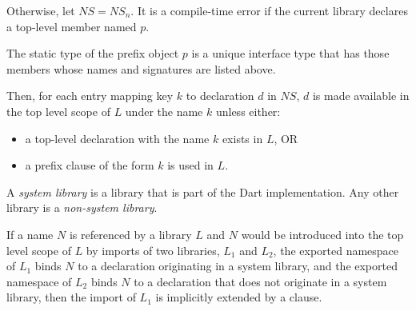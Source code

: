 \documentclass{article}
\begin{document}
\LMHash{}
Otherwise, let $NS = NS_n$.
It is a compile-time error if the current library declares a top-level member named $p$.

The static type of the prefix object $p$ is a unique interface type that has those members whose names and signatures are listed above.


\LMHash{}
Then, for each entry mapping key $k$ to declaration $d$ in $NS$, $d$ is made available in the top level scope of $L$ under the name $k$ unless either:
\begin{itemize}
\item
a top-level declaration with the name $k$ exists in $L$, OR
\item a prefix clause of the form \AS{} $k$ is used in $L$.
\end{itemize}


\LMHash{}
A {\em system library} is a library that is part of the Dart implementation.
Any other library is a {\em non-system library}.

If a name $N$ is referenced by a library $L$
and $N$ would be introduced into the top level scope of $L$
by imports of two libraries, $L_1$ and $L_2$,
the exported namespace of $L_1$ binds $N$
to a declaration originating in a system library,
and the exported namespace of $L_2$ binds $N$ to a declaration
that does not originate in a system library,
then the import of $L_1$ is implicitly extended by a  clause.

\end{document}
